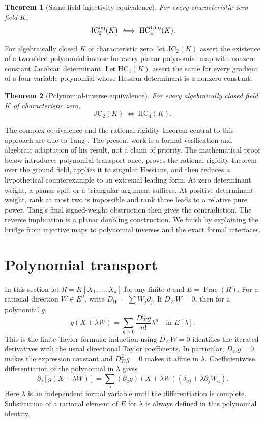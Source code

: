\documentclass[11pt,a4paper]{article}
\newtheorem{theorem}{Theorem}[section]
\begin{document}
\begin{theorem}[Same-field injectivity equivalence]\label{thm:inj}
For every characteristic-zero field $K$,
\[
 \mathrm{JC}_2^{\rm inj}(K)\ \Longleftrightarrow\
 \mathrm{HC}_4^{1,\rm inj}(K).
\]
\end{theorem}

For algebraically closed $K$ of characteristic zero, let $\mathrm{JC}_2(K)$ assert the existence of a two-sided polynomial inverse for every planar polynomial map with nonzero constant Jacobian determinant. Let $\mathrm{HC}_4(K)$ assert the same for every gradient of a four-variable polynomial whose Hessian determinant is a nonzero constant.

\begin{theorem}[Polynomial-inverse equivalence]\label{thm:equiv}
For every algebraically closed field $K$ of characteristic zero,
\[
 \mathrm{JC}_2(K)\ \Longleftrightarrow\ \mathrm{HC}_4(K).
\]
\end{theorem}

The complex equivalence and the rational rigidity theorem central to this approach are due to Tang \cite{tang}. The present work is a formal verification and algebraic adaptation of his result, not a claim of priority. The mathematical proof below introduces polynomial transport once, proves the rational rigidity theorem over the ground field, applies it to singular Hessians, and then reduces a hypothetical counterexample to an extremal leading form. At zero determinant weight, a planar split or a triangular argument suffices. At positive determinant weight, rank at most two is impossible and rank three leads to a relative pure power. Tang's final signed-weight obstruction then gives the contradiction. The reverse implication is a planar doubling construction. We finish by explaining the bridge from injective maps to polynomial inverses and the exact formal interfaces.

\section{Polynomial transport}\label{sec:transport}

In this section let $R=K[X_1,\ldots,X_d]$ for any finite $d$ and $E=\operatorname{Frac}(R)$. For a rational direction $W\in E^d$, write $D_W=\sum W_j\partial_j$. If $D_WW=0$, then for a polynomial $g$,
\[
 g(X+\lambda W)=\sum_{n\ge0}\frac{D_W^ng}{n!}\lambda^n
 \quad\text{in }E[\lambda].
\]
This is the finite Taylor formula: induction using $D_WW=0$ identifies the iterated derivatives with the usual directional Taylor coefficients. In particular, $D_Wg=0$ makes the expression constant and $D_W^2g=0$ makes it affine in $\lambda$. Coefficientwise differentiation of the polynomial in $\lambda$ gives
\begin{equation}\label{eq:chain}
 \partial_j[g(X+\lambda W)]
 =\sum_a(\partial_a g)(X+\lambda W)
       (\delta_{aj}+\lambda\partial_j W_a).
\end{equation}
Here $\lambda$ is an independent formal variable until the differentiation is complete. Substitution of a rational element of $E$ for $\lambda$ is always defined in this polynomial identity.
\end{document}
